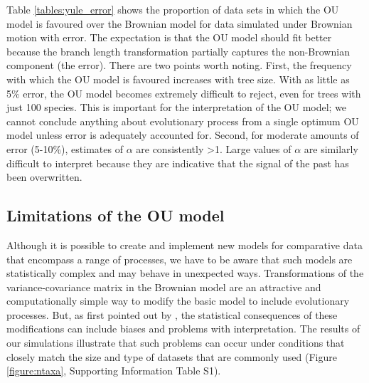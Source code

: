 \documentclass[a4paper,12pt]{article}
\begin{document}
  Table \ref{tables:yule_error} shows the proportion of data sets in which the OU model is favoured over the Brownian model for data simulated under Brownian motion with error. 
  The expectation is that the OU model should fit better because the branch length transformation partially captures the non-Brownian component (the error). There are two points worth noting. 
  First, the frequency with which the OU model is favoured increases with tree size. With as little as 5\% error, the OU model becomes extremely difficult to reject, even for trees with just 100 species. 
  This is important for the interpretation of the OU model; we cannot conclude anything about evolutionary process from a single optimum OU model unless error is adequately accounted for. 
  Second, for moderate amounts of error (5-10\%), estimates of $\alpha$ are consistently \textgreater 1. 
  Large values of $\alpha$ are similarly difficult to interpret because they are indicative that the signal of the past has been overwritten. 

  \subsection{Limitations of the OU model}
  Although it is possible to create and implement new models for comparative data that encompass a range of processes, we have to be aware that such models are statistically complex and may behave in unexpected ways. 
  Transformations of the variance-covariance matrix in the Brownian model \citep[e.g. $\lambda$;][]{Pagel:1997aa} are an attractive and computationally simple way to modify the basic model to include evolutionary processes. 
  But, as first pointed out by \citet{grafen1989phylogenetic}, the statistical consequences of these modifications can include biases and problems with interpretation. 
  The results of our simulations illustrate that such problems can occur under conditions that closely match the size and type of datasets that are commonly used (Figure \ref{figure:ntaxa}, Supporting Information Table S1).
  
\end{document}
